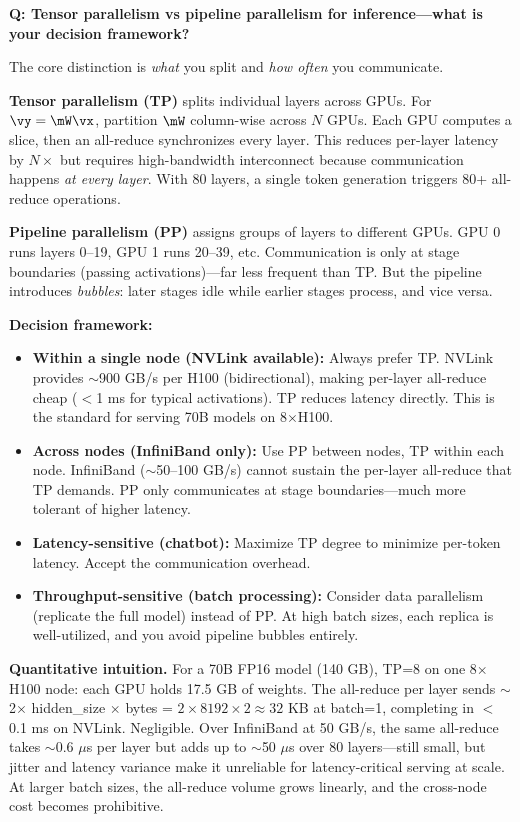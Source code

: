 \begin{interviewq}
\textbf{Q: Tensor parallelism vs pipeline parallelism for inference---what is your decision framework?}

 \quad {} \quad \badgefreq{\freqhigh}

\stronganswer

The core distinction is \textit{what} you split and \textit{how often} you communicate.

\textbf{Tensor parallelism (TP)} splits individual layers across GPUs. For $\vy = \mW\vx$, partition $\mW$ column-wise across $N$ GPUs. Each GPU computes a slice, then an all-reduce synchronizes every layer. This reduces per-layer latency by $N\times$ but requires high-bandwidth interconnect because communication happens \textit{at every layer}. With 80 layers, a single token generation triggers 80+ all-reduce operations.

\textbf{Pipeline parallelism (PP)} assigns groups of layers to different GPUs. GPU 0 runs layers 0--19, GPU 1 runs 20--39, etc. Communication is only at stage boundaries (passing activations)---far less frequent than TP. But the pipeline introduces \textit{bubbles}: later stages idle while earlier stages process, and vice versa.

\textbf{Decision framework:}
\begin{itemize}
    \item \textbf{Within a single node (NVLink available):} Always prefer TP. NVLink provides $\sim$900 GB/s per H100 (bidirectional), making per-layer all-reduce cheap ($<$1 ms for typical activations). TP reduces latency directly. This is the standard for serving 70B models on 8$\times$H100.
    \item \textbf{Across nodes (InfiniBand only):} Use PP between nodes, TP within each node. InfiniBand ($\sim$50--100 GB/s) cannot sustain the per-layer all-reduce that TP demands. PP only communicates at stage boundaries---much more tolerant of higher latency.
    \item \textbf{Latency-sensitive (chatbot):} Maximize TP degree to minimize per-token latency. Accept the communication overhead.
    \item \textbf{Throughput-sensitive (batch processing):} Consider data parallelism (replicate the full model) instead of PP. At high batch sizes, each replica is well-utilized, and you avoid pipeline bubbles entirely.
\end{itemize}

\textbf{Quantitative intuition.} For a 70B FP16 model (140 GB), TP=8 on one 8$\times$H100 node: each GPU holds 17.5 GB of weights. The all-reduce per layer sends $\sim$2$\times$ hidden\_size $\times$ bytes = $2 \times 8192 \times 2 \approx 32$ KB at batch=1, completing in $<$0.1 ms on NVLink. Negligible. Over InfiniBand at 50 GB/s, the same all-reduce takes $\sim$0.6 $\mu$s per layer but adds up to $\sim$50 $\mu$s over 80 layers---still small, but jitter and latency variance make it unreliable for latency-critical serving at scale. At larger batch sizes, the all-reduce volume grows linearly, and the cross-node cost becomes prohibitive.


\end{interviewq}
